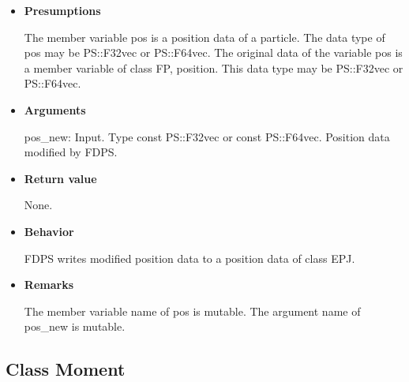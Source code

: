 \begin{itemize}

\item {\bf Presumptions}
  
  The member variable pos is a position data of a particle. The data
  type of pos may be PS::F32vec or PS::F64vec. The original data of
  the variable pos is a member variable of class FP, position. This
  data type may be PS::F32vec or PS::F64vec.

\item {\bf Arguments}

  pos\_new: Input. Type const PS::F32vec or const PS::F64vec. Position
  data modified by FDPS.

\item {\bf Return value}

  None.
  
\item {\bf Behavior}

  FDPS writes modified position data to a position data of class EPJ.

\item {\bf Remarks}

  The member variable name of pos is mutable. The argument name of
  pos\_new is mutable. 

\end{itemize}

\subsection{Class Moment}
\label{sec:example_moment}

